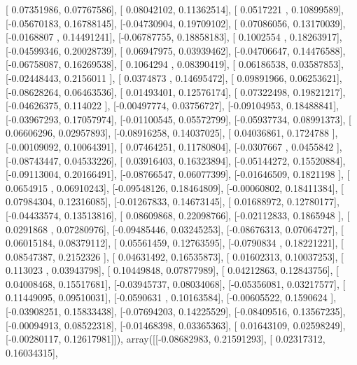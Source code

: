 \documentclass{article}
\begin{document}
       [ 0.07351986,  0.07767586],
       [ 0.08042102,  0.11362514],
       [ 0.0517221 ,  0.10899589],
       [-0.05670183,  0.16788145],
       [-0.04730904,  0.19709102],
       [ 0.07086056,  0.13170039],
       [-0.0168807 ,  0.14491241],
       [-0.06787755,  0.18858183],
       [ 0.1002554 ,  0.18263917],
       [-0.04599346,  0.20028739],
       [ 0.06947975,  0.03939462],
       [-0.04706647,  0.14476588],
       [-0.06758087,  0.16269538],
       [ 0.1064294 ,  0.08390419],
       [ 0.06186538,  0.03587853],
       [-0.02448443,  0.2156011 ],
       [ 0.0374873 ,  0.14695472],
       [ 0.09891966,  0.06253621],
       [-0.08628264,  0.06463536],
       [ 0.01493401,  0.12576174],
       [ 0.07322498,  0.19821217],
       [-0.04626375,  0.114022  ],
       [-0.00497774,  0.03756727],
       [-0.09104953,  0.18488841],
       [-0.03967293,  0.17057974],
       [-0.01100545,  0.05572799],
       [-0.05937734,  0.08991373],
       [ 0.06606296,  0.02957893],
       [-0.08916258,  0.14037025],
       [ 0.04036861,  0.1724788 ],
       [-0.00109092,  0.10064391],
       [ 0.07464251,  0.11780804],
       [-0.0307667 ,  0.0455842 ],
       [-0.08743447,  0.04533226],
       [ 0.03916403,  0.16323894],
       [-0.05144272,  0.15520884],
       [-0.09113004,  0.20166491],
       [-0.08766547,  0.06077399],
       [-0.01646509,  0.1821198 ],
       [ 0.0654915 ,  0.06910243],
       [-0.09548126,  0.18464809],
       [-0.00060802,  0.18411384],
       [ 0.07984304,  0.12316085],
       [-0.01267833,  0.14673145],
       [ 0.01688972,  0.12780177],
       [-0.04433574,  0.13513816],
       [ 0.08609868,  0.22098766],
       [-0.02112833,  0.1865948 ],
       [ 0.0291868 ,  0.07280976],
       [-0.09485446,  0.03245253],
       [-0.08676313,  0.07064727],
       [ 0.06015184,  0.08379112],
       [ 0.05561459,  0.12763595],
       [-0.0790834 ,  0.18221221],
       [ 0.08547387,  0.2152326 ],
       [ 0.04631492,  0.16535873],
       [ 0.01602313,  0.10037253],
       [ 0.113023  ,  0.03943798],
       [ 0.10449848,  0.07877989],
       [ 0.04212863,  0.12843756],
       [ 0.04008468,  0.15517681],
       [-0.03945737,  0.08034068],
       [-0.05356081,  0.03217577],
       [ 0.11449095,  0.09510031],
       [-0.0590631 ,  0.10163584],
       [-0.00605522,  0.1590624 ],
       [-0.03908251,  0.15833438],
       [-0.07694203,  0.14225529],
       [-0.08409516,  0.13567235],
       [-0.00094913,  0.08522318],
       [-0.01468398,  0.03365363],
       [ 0.01643109,  0.02598249],
       [-0.00280117,  0.12617981]]), array([[-0.08682983,  0.21591293],
       [ 0.02317312,  0.16034315],
\end{document}
